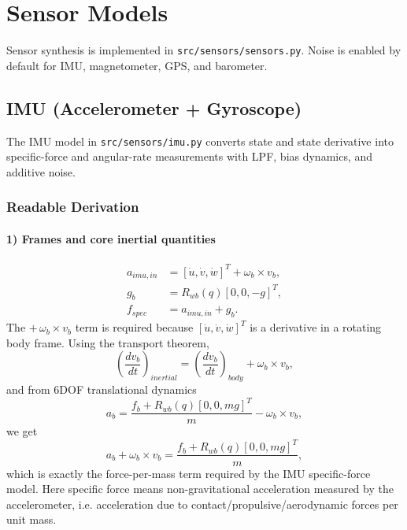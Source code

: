 \documentclass[11pt,a4paper]{article}
\begin{document}
\section{Sensor Models}
Sensor synthesis is implemented in \texttt{src/sensors/sensors.py}. Noise is enabled by default for IMU, magnetometer, GPS, and barometer.

\subsection{IMU (Accelerometer + Gyroscope)}
The IMU model in \texttt{src/sensors/imu.py} converts state and state derivative into specific-force and angular-rate measurements with LPF, bias dynamics, and additive noise.

\subsubsection*{Readable Derivation}
\paragraph{1) Frames and core inertial quantities}
\begin{align}
a_{imu,in} &= [\dot{u},\dot{v},\dot{w}]^T + \omega_b \times v_b, \\
g_b &= R_{wb}(q)[0,0,-g]^T, \\
f_{spec} &= a_{imu,in} + g_b.
\end{align}
The $+\,\omega_b\times v_b$ term is required because $[\dot{u},\dot{v},\dot{w}]^T$ is a derivative in a rotating body frame. Using the transport theorem,
\begin{equation}
\left(\frac{d v_b}{dt}\right)_{inertial}=\left(\frac{d v_b}{dt}\right)_{body}+\omega_b\times v_b,
\end{equation}
and from 6DOF translational dynamics
\begin{equation}
a_b=\frac{f_b + R_{wb}(q)[0,0,mg]^T}{m}-\omega_b\times v_b,
\end{equation}
we get
\begin{equation}
a_b+\omega_b\times v_b=\frac{f_b + R_{wb}(q)[0,0,mg]^T}{m},
\end{equation}
which is exactly the force-per-mass term required by the IMU specific-force model. Here specific force means non-gravitational acceleration measured by the accelerometer, i.e. acceleration due to contact/propulsive/aerodynamic forces per unit mass.
\end{document}
